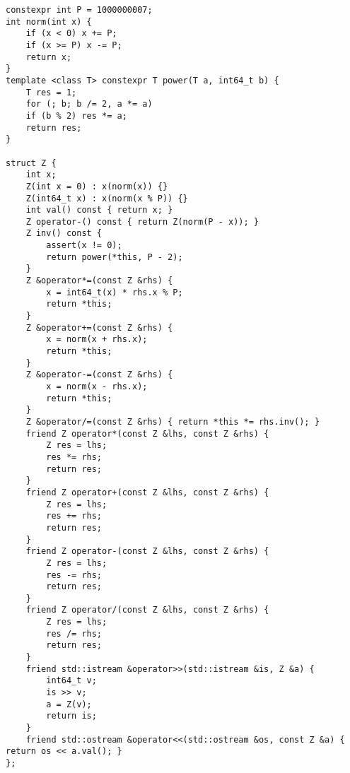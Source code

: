 \begin{lstlisting}
constexpr int P = 1000000007;
int norm(int x) {
	if (x < 0) x += P;
	if (x >= P) x -= P;
	return x;
}
template <class T> constexpr T power(T a, int64_t b) {
	T res = 1;
	for (; b; b /= 2, a *= a)
	if (b % 2) res *= a;
	return res;
}

struct Z {
	int x;
	Z(int x = 0) : x(norm(x)) {}
	Z(int64_t x) : x(norm(x % P)) {}
	int val() const { return x; }
	Z operator-() const { return Z(norm(P - x)); }
	Z inv() const {
		assert(x != 0);
		return power(*this, P - 2);
	}
	Z &operator*=(const Z &rhs) {
		x = int64_t(x) * rhs.x % P;
		return *this;
	}
	Z &operator+=(const Z &rhs) {
		x = norm(x + rhs.x);
		return *this;
	}
	Z &operator-=(const Z &rhs) {
		x = norm(x - rhs.x);
		return *this;
	}
	Z &operator/=(const Z &rhs) { return *this *= rhs.inv(); }
	friend Z operator*(const Z &lhs, const Z &rhs) {
		Z res = lhs;
		res *= rhs;
		return res;
	}
	friend Z operator+(const Z &lhs, const Z &rhs) {
		Z res = lhs;
		res += rhs;
		return res;
	}
	friend Z operator-(const Z &lhs, const Z &rhs) {
		Z res = lhs;
		res -= rhs;
		return res;
	}
	friend Z operator/(const Z &lhs, const Z &rhs) {
		Z res = lhs;
		res /= rhs;
		return res;
	}
	friend std::istream &operator>>(std::istream &is, Z &a) {
		int64_t v;
		is >> v;
		a = Z(v);
		return is;
	}
	friend std::ostream &operator<<(std::ostream &os, const Z &a) { return os << a.val(); }
};
\end{lstlisting}